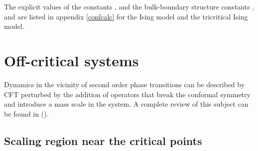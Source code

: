 \documentclass[a4paper,12pt]{report}
\begin{document}
\vspace{0.5cm}

The explicit values of the constants \coordHE{}, \coordHE{} and the bulk-boundary structure constants \coordHE{}, \coordHE{} and \coordHE{} are listed in appendix
\ref{confcalc} for the Ising model and the tricritical Ising model.





\newpage

\chapter{Off-critical systems}

Dynamics in the vicinity of second order phase transitions can be described by CFT perturbed by the addition of
operators that break the conformal symmetry and introduce a mass scale in the system. A complete review of this
subject can be found in (\cite{mussrev}).

\vspace{1cm}

\section{Scaling region near the critical points}
\end{document}
